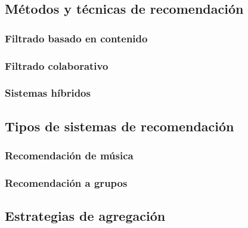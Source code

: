 \subsection{Métodos y técnicas de recomendación\label{SEC:METODOS_RECOMENDACION}}


    \subsubsection{Filtrado basado en contenido\label{SEC:RECOMENDADORES_CONTENIDO}}
    \subsubsection{Filtrado colaborativo\label{SEC:RECOMENDADORES_COLABORATIVOS}}
    \subsubsection{Sistemas híbridos\label{SEC:RECOMENDADORES_HIBRIDOS}}

\subsection{Tipos de sistemas de recomendación\label{SEC:TIPOS_RECOMENDADORES}}
    \subsubsection{Recomendación de música\label{SEC:RECOMENDACION_MUSICA}}
    \subsubsection{Recomendación a grupos\label{SEC:RECOMENDACION_GRUPOS}}

\subsection{Estrategias de agregación\label{SEC:AGREGACION}}




